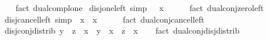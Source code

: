 \begin{isabellebody}
%
\isadelimproof
\ \ %
\endisadelimproof
%
\isatagproof
{}\isamarkupfalse%
\ {\isacharparenleft}{\kern0pt}fact\ dual{\isachardot}{\kern0pt}compl{\isacharunderscore}{\kern0pt}one{\isacharparenright}{\kern0pt}%
\endisatagproof
{\isafoldproof}%
%
\isadelimproof
\isanewline
%
\endisadelimproof
\isanewline
{}\isamarkupfalse%
\ disj{\isacharunderscore}{\kern0pt}one{\isacharunderscore}{\kern0pt}left\ {\isacharbrackleft}{\kern0pt}simp{\isacharbrackright}{\kern0pt}{\isacharcolon}{\kern0pt}\ {\isachardoublequoteopen}\ \isactrlbold {\isasymsqunion}\ x\ {\isacharequal}{\kern0pt}\ \isanewline
%
\isadelimproof
\ \ %
\endisadelimproof
%
\isatagproof
{}\isamarkupfalse%
\ {\isacharparenleft}{\kern0pt}fact\ dual{\isachardot}{\kern0pt}conj{\isacharunderscore}{\kern0pt}zero{\isacharunderscore}{\kern0pt}left{\isacharparenright}{\kern0pt}%
\endisatagproof
{\isafoldproof}%
%
\isadelimproof
\isanewline
%
\endisadelimproof
\isanewline
{}\isamarkupfalse%
\ disj{\isacharunderscore}{\kern0pt}cancel{\isacharunderscore}{\kern0pt}left\ {\isacharbrackleft}{\kern0pt}simp{\isacharbrackright}{\kern0pt}{\isacharcolon}{\kern0pt}\ {\isachardoublequoteopen}\isactrlbold {\isacharminus}{\kern0pt}\ x\ \isactrlbold {\isasymsqunion}\ x\ {\isacharequal}{\kern0pt}\ \isanewline
%
\isadelimproof
\ \ %
\endisadelimproof
%
\isatagproof
{}\isamarkupfalse%
\ {\isacharparenleft}{\kern0pt}fact\ dual{\isachardot}{\kern0pt}conj{\isacharunderscore}{\kern0pt}cancel{\isacharunderscore}{\kern0pt}left{\isacharparenright}{\kern0pt}%
\endisatagproof
{\isafoldproof}%
%
\isadelimproof
\isanewline
%
\endisadelimproof
\isanewline
{}\isamarkupfalse%
\ disj{\isacharunderscore}{\kern0pt}conj{\isacharunderscore}{\kern0pt}distrib{}{\isacharcolon}{\kern0pt}\ {\isachardoublequoteopen}{\isacharparenleft}{\kern0pt}y\ \isactrlbold {\isasymsqinter}\ z{\isacharparenright}{\kern0pt}\ \isactrlbold {\isasymsqunion}\ x\ {\isacharequal}{\kern0pt}\ {\isacharparenleft}{\kern0pt}y\ \isactrlbold {\isasymsqunion}\ x{\isacharparenright}{\kern0pt}\ \isactrlbold {\isasymsqinter}\ {\isacharparenleft}{\kern0pt}z\ \isactrlbold {\isasymsqunion}\ x{\isacharparenright}{\kern0pt}{\isachardoublequoteclose}\isanewline
%
\isadelimproof
\ \ %
\endisadelimproof
%
\isatagproof
{}\isamarkupfalse%
\ {\isacharparenleft}{\kern0pt}fact\ dual{\isachardot}{\kern0pt}conj{\isacharunderscore}{\kern0pt}disj{\isacharunderscore}{\kern0pt}distrib{}{\isacharparenright}{\kern0pt}%

\end{isabellebody}
